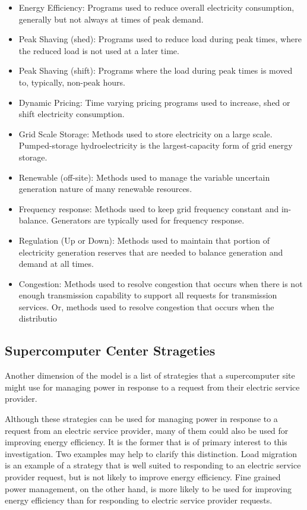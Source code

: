 \documentclass{llncs}
\begin{document}
\begin{itemize}
\item Energy Efficiency: Programs used to reduce overall electricity consumption, generally but not always at times of
 peak demand.
\item Peak Shaving (shed): Programs used to reduce load during peak times, where the reduced load is not used at a 
later time.
\item Peak Shaving (shift): Programs where the load during peak times is moved to, typically, non-peak hours.
\item Dynamic Pricing: Time varying pricing programs used to increase, shed or shift electricity consumption.
\item Grid Scale Storage: Methods used to store electricity on a large scale. Pumped-storage hydroelectricity 
is the largest-capacity form of grid energy storage.
\item Renewable (off-site): Methods used to manage the variable uncertain generation nature of many renewable resources.
\item Frequency response: Methods used to keep grid frequency constant and in-balance. Generators are typically used for frequency response.
\item Regulation (Up or Down): Methods used to maintain that portion of electricity generation reserves 
that are needed to balance generation and demand at all times.
\item Congestion: Methods used to resolve congestion that occurs when there is not enough transmission capability to 
support all requests for transmission services. Or, methods used to resolve congestion that occurs when the distributio
\end{itemize}

\subsection{Supercomputer Center Strageties}

Another dimension of the model is a list of strategies that a supercomputer
site might use for managing power in response to a request from their
electric service provider.

Although these strategies can be used for managing power in response to a
request from an electric service provider, many of them could also be used
for improving energy efficiency. It is the former that is of primary
interest to this investigation. Two examples may help to clarify this
distinction. Load migration is an example of a strategy that is well suited
to responding to an electric service provider request, but is not likely to
improve energy efficiency. Fine grained power management, on the other hand,
is more likely to be used for improving energy efficiency than for
responding to electric service provider requests.
\end{document}
